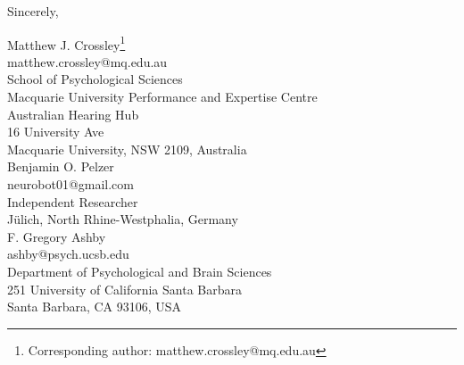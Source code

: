 \documentclass[10pt]{article}
\begin{document}
Sincerely,

Matthew J. Crossley\footnote{Corresponding author: matthew.crossley@mq.edu.au} \\
matthew.crossley@mq.edu.au \\
School of Psychological Sciences \\
Macquarie University Performance and Expertise Centre \\
Australian Hearing Hub \\
16 University Ave \\
Macquarie University, NSW 2109, Australia \\

Benjamin O. Pelzer \\
neurobot01@gmail.com \\
Independent Researcher \\
J\"ulich, North Rhine-Westphalia, Germany \\

F. Gregory Ashby \\
ashby@psych.ucsb.edu \\
Department of Psychological and Brain Sciences \\
251 University of California Santa Barbara \\
Santa Barbara, CA 93106, USA \\
\end{document}
